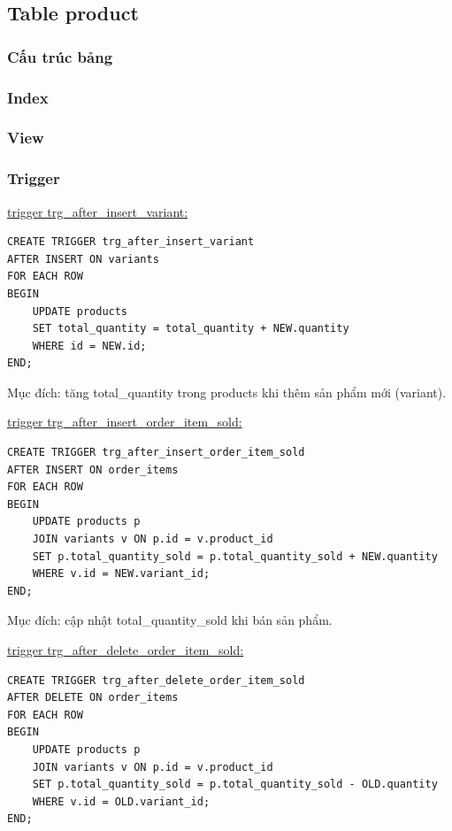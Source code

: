 \subsection{Table product}

\subsubsection{Cấu trúc bảng}

\subsubsection{Index}

\subsubsection{View}

\subsubsection{Trigger}

\underline{trigger trg\_after\_insert\_variant:}

\begin{verbatim}
CREATE TRIGGER trg_after_insert_variant
AFTER INSERT ON variants
FOR EACH ROW
BEGIN
    UPDATE products
    SET total_quantity = total_quantity + NEW.quantity
    WHERE id = NEW.id;
END;
\end{verbatim}

Mục đích: tăng total\_quantity trong products khi thêm sản phẩm mới (variant).

\underline{trigger trg\_after\_insert\_order\_item\_sold:}

\begin{verbatim}
CREATE TRIGGER trg_after_insert_order_item_sold
AFTER INSERT ON order_items
FOR EACH ROW
BEGIN
    UPDATE products p
    JOIN variants v ON p.id = v.product_id
    SET p.total_quantity_sold = p.total_quantity_sold + NEW.quantity
    WHERE v.id = NEW.variant_id;
END;
\end{verbatim}

Mục đích: cập nhật total\_quantity\_sold khi bán sản phẩm.

\underline{trigger trg\_after\_delete\_order\_item\_sold:}

\begin{verbatim}
CREATE TRIGGER trg_after_delete_order_item_sold
AFTER DELETE ON order_items
FOR EACH ROW
BEGIN
    UPDATE products p
    JOIN variants v ON p.id = v.product_id
    SET p.total_quantity_sold = p.total_quantity_sold - OLD.quantity
    WHERE v.id = OLD.variant_id;
END;
\end{verbatim}

